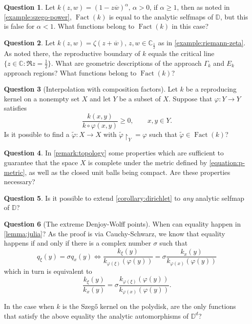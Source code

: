 \documentclass[leqno, final]{article}
\theoremstyle{definition}
\newtheorem{question}{Question}
\newcommand{\disk}{\mathbb{D}}
\newcommand{\plane}{\mathbb{C}}
\renewcommand{\phi}{\varphi}
\DeclareMathOperator{\Fact}{Fact}
\begin{document}
\begin{question}
Let $k(z,w)=(1-z\overline w)^\alpha,\,\alpha>0$, if $\alpha\geq1$, then
as noted in \cref{example:szego-power}, $\Fact(k)$ is equal to the analytic
selfmaps of $\disk$, but this is false for $\alpha<1$. What functions belong to $\Fact(k)$
in this case?
\end{question}

\begin{question}\label{question:riemann-zeta}
Let $k(z,w) = \zeta(z+\overline w),\,z,w\in\plane_\frac12$ as in \cref{example:riemann-zeta}.
As noted there, the reproductive boundary of $k$ equals the critical line
$\{z\in\plane:\Re{z}=\frac12\}$. What are geometric descriptions of the approach $\Gamma_k$
and $E_k$ approach regions? What functions belong to $\Fact(k)$?
\end{question}

\begin{question}[Interpolation with composition factors]
Let $k$ be a reproducing kernel on a nonempty set $X$ and let $Y$ be a subset of $X$.
Suppose that $\phi:Y\to Y$ satisfies \begin{equation}
	\frac{k(x,y)}{k\circ\phi(x,y)} \geq 0, \qquad x,y\in Y.
\end{equation}
Is it possible to find a $\tilde\phi:X\to X$ with $\tilde\phi\restriction_Y=\phi$ such
that $\tilde\phi\in\Fact(k)$?
\end{question}

\begin{question}
In \cref{remark:topology} some properties which are sufficient to guarantee
that the space $X$ is complete under the metric defined by
\eqref{equation:p-metric}, as well as the closed unit balls being compact.
Are these properties necessary?
\end{question}

\begin{question}
Is it possible to extend \cref{corollary:dirichlet} to \emph{any} analytic
selfmap of $\disk$?
\end{question}

\begin{question}[The extreme Denjoy-Wolff points]\label{question:iteration}
When can equality happen in \cref{lemma:julia}? As the proof is via Cauchy-Schwarz,
we know that equality happens if and only if there is a complex number $\sigma$ such
that \[
	q_\xi(y) = \sigma q_x(y)
	\iff \frac{k_\xi(y)}{k_{\phi(\xi)}(\phi(y))} = \sigma\frac{k_x(y)}{k_{\phi(x)}(\phi(y))}
\]
which in turn is equivalent to \begin{equation}
	\frac{k_\xi(y)}{k_x(y)} = \sigma\frac{k_{\phi(\xi)}(\phi(y))}{k_{\phi(x)}(\phi(y))}.
\end{equation}

In the case when $k$ is the Szegő kernel on the
polydisk, are the only functions that satisfy the above equality the analytic automorphisms of $\disk^d$?
\end{question}
\end{document}
